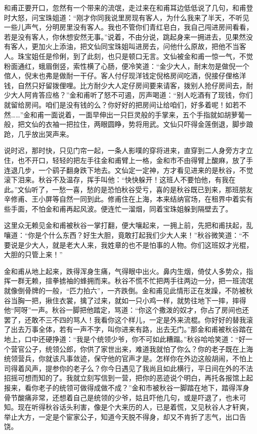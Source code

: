 \documentclass[12pt,UTF8]{ctexbook}
\begin{document}
{{{和甫正要开口，忽然有一个带来的流氓，走过来在和甫耳边低低说了几句，和甫登时大怒，问宝珠姐道：“刚才你同我说里房现有客人，为什么我来了半天，不听见一些儿声气，分明房里没有客人。我也不管你们青红皂白，我自己闯进房间看看，若是没有客人，你休想安然无事。”说着，不由分说，跳起身来一拥进去，见果然没有客人，更加火上添油，把文仙同宝珠姐叫进房去，问他什么原故，把他不当客人。珠宝姐任是伶俐，到了此刻，也只是顿口无言。文仙被金和甫一惊一气，不觉粉面通红，蛾眉倒竖，索性横了心肠，便冷笑道：“金少大人，耐末勿是做倪一个倌人，倪末也弗是做耐一干仔。客人付仔现洋钱定倪格房间吃酒，倪接仔俚格洋钱，自然只好留拨俚哩。比方耐少大人定仔房间要来请客，拨别人抢仔房间去，耐少大人阿肯答应格？”金和甫听了怒不可遏，厉声喝道：“别人吃酒有了现钱，你们就留给房间。咱们是没有钱的么？你好好的把房间让给咱们，好多着呢！如若不然……”金和甫一面说着，一面早伸出一只巨灵般的手掌来，五个手指就如胡萝葡一般，把文仙的衣袖一把拉住，两眼圆睁，势将用武。文仙只吓得金莲倒退，脚步踉跄，几乎放出哭声来。

说时迟，那时快，只见门帘一起，一条人影噗的穿将进来，直穿到二人身旁方才立住，也不开口，轻轻的把左手往金和甫臂上一格，金和市不由得臂上酸麻，放了手连退几步，一个鹞子翻身跌下地去。文仙定一定神，方才看见进来的是秋谷，不觉滚下泪来。秋谷不及温存，挥手叫他：“快快躲开！这班人不要怕他，有我在此。”文仙听了，一愁一喜，愁的是恐怕秋谷受亏，喜的是秋谷既已到来，那班朋友辛修甫、王小屏等自然一同到此。修甫住在上海，本来结纳官场，在租界中着实有些手面，不怕金和甫再起风波。便连忙一溜烟，同着宝珠姐躲到隔壁去了。

这里众无赖见金和甫被秋谷一掌打翻，便大嚷起来，一拥上前，先把和甫扶起，乱嚷道：“你是个什么东西？好生大胆，竟敢打起我们少大人来！”秋谷微笑道：“不要说是少大人，就是老大人来，我姓章的也不是怕事的人物。你们这班奴才光棍，大胆的只管上来！”

金和甫从地上起来，跌得浑身生痛，气得眼中出火。鼻内生烟，倚仗人多势众，指挥一群无赖，揎拳掳袖的蜂拥而来。秋谷不慌不忙把两手往两边一分，把一班流氓就像倒骨牌的一般，“匹力拍六”，一齐跌倒。金和甫见此情形正在发躁，不防被秋谷当胸一把，揪住衣裳，擒了过来，就如一只小鸡一样，就势往地下一摔，摔得他“阿呀”一声。秋谷一脚把他踏定，骂道：“你这个撒泼的奴才，你占了房间也还罢了，还敢不三不四的骂人！我看你这个样儿，一定是外来流棍。你好好的替我滚了出去万事全体，若有一声不字，叫你进来有路，出去无门。”那金和甫被秋谷踏在地上，口中还硬挣道：“我是个统领少爷，你不可如此糟蹋。”秋谷哈哈笑道：“好一个营官公子，统领公郎，你供了家世出来，难道我就怕了你么？你的老子既在上海统领营兵，你就该凡事敛迹，保守他的官声才是。怎样你在外边这般胡闹，不怕上司得着风声，提参你的老子么？你今日遇见了我尚且如此横行，平日间在外的不法招摇可想而知的了。我就立刻写信到一营，把你的恶迹说个明白，再托各报馆上起报来，看你老子的统领可做得成做不成？”金和市被秋谷一脚踏在地下，踏得浑身骨节酸痛非常，还想着自己是统领的少爷，姑且吓他几句，或是吓退了，也未可知。现在听得秋谷话头利害，像是个大来历的人，已是着慌，又见秋谷人才轩爽，举止大方，一定是个宦家公子，知道今天脱不得身，却又不肯折了志气，出口告饶。

}}}
\end{document}
